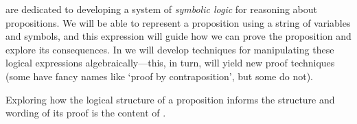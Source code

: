  are dedicated to developing a system of \textit{symbolic logic} for reasoning about propositions. We will be able to represent a proposition using a string of variables and symbols, and this expression will guide how we can prove the proposition and explore its consequences. In  we will develop techniques for manipulating these logical expressions algebraically---this, in turn, will yield new proof techniques (some have fancy names like `proof by contraposition', but some do not).

Exploring how the logical structure of a proposition informs the structure and wording of its proof is the content of .